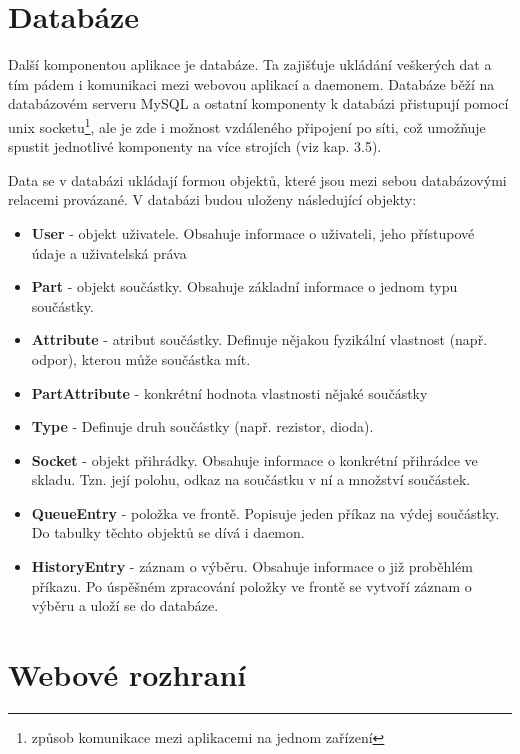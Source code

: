 \documentclass[12pt, a4paper, oneside]{article}
\begin{document}
\section{Databáze}  %

Další komponentou aplikace je databáze. Ta zajišťuje ukládání veškerých dat a tím pádem i komunikaci mezi webovou aplikací a daemonem. Databáze běží na databázovém serveru MySQL a ostatní komponenty k databázi přistupují pomocí unix socketu\footnote{způsob komunikace mezi aplikacemi na jednom zařízení}, ale je zde i možnost vzdáleného připojení po síti, což umožňuje spustit jednotlivé komponenty na více strojích (viz kap. 3.5).

Data se v databázi ukládají formou objektů, které jsou mezi sebou databázovými relacemi provázané. V databázi budou uloženy následující objekty:

\begin{itemize}
\item \textbf{User} - objekt uživatele. Obsahuje informace o uživateli, jeho přístupové údaje a uživatelská práva
\item \textbf{Part} - objekt součástky. Obsahuje základní informace o jednom typu součástky.
\item \textbf{Attribute} - atribut součástky. Definuje nějakou fyzikální vlastnost (např. odpor), kterou může součástka mít.
\item \textbf{PartAttribute} - konkrétní hodnota vlastnosti nějaké součástky
\item \textbf{Type} - Definuje druh součástky (např. rezistor, dioda).
\item \textbf{Socket} - objekt přihrádky. Obsahuje informace o konkrétní přihrádce ve skladu. Tzn. její polohu, odkaz na součástku v ní a množství součástek.
\item \textbf{QueueEntry} - položka ve frontě. Popisuje jeden příkaz na výdej součástky. Do tabulky těchto objektů se dívá i daemon.
\item \textbf{HistoryEntry} - záznam o výběru. Obsahuje informace o již proběhlém příkazu. Po úspěšném zpracování položky ve frontě se vytvoří záznam o výběru a uloží se do databáze.
\end{itemize}


\section{Webové rozhraní}  %
\end{document}
